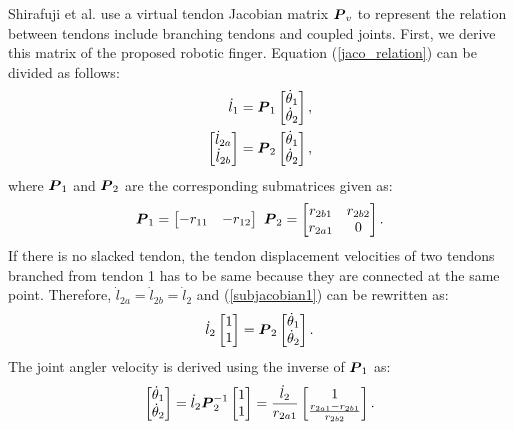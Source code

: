 \documentclass{llncs}
\def\vect#1{\mbox{\boldmath$#1$}}
\begin{document}
Shirafuji et al.\cite{shirafuji2014b} use a virtual tendon Jacobian matrix $\vect{P}_v$ to represent the relation between tendons include branching tendons and coupled joints.
First, we derive this matrix of the proposed robotic finger.
Equation (\ref{jaco_relation}) can be divided as follows:
\begin{align}
	\dot{l}_{1}&=\vect{P}_{1}
							\begin{bmatrix}
								\dot{\theta}_{1}\\
								\dot{\theta}_{2}
							\end{bmatrix},		\label{subjacobian2}\\
	\begin{bmatrix}
		\dot{l}_{2a}\\
		\dot{l}_{2b}
	\end{bmatrix}&=\vect{P}_{2}
							\begin{bmatrix}
						\dot{\theta}_{1}\\
						\dot{\theta}_{2}
							\end{bmatrix},		\label{subjacobian1}
\end{align}
where $\vect{P}_{1}$ and $\vect{P}_{2}$ are the corresponding submatrices given as:
\begin{align}
	\vect{P}_{1}=
			\begin{bmatrix}
				-r_{11}&-r_{12}
			\end{bmatrix}
				\ 
	\vect{P}_{2}=
			\begin{bmatrix}
				r_{2b1}&r_{2b2}\\
				r_{2a1}&0
			\end{bmatrix}.			\label{subjacobian_value}
\end{align}
If there is no slacked tendon, the tendon displacement velocities of two tendons branched from tendon 1 has to be same because they are connected at the same point.
Therefore, $\dot{l}_{2a}=\dot{l}_{2b}=\dot{l}_{2}$ and (\ref{subjacobian1}) can be rewritten as:
\begin{align}
	\dot{l}_{2}
	\begin{bmatrix}
		1\\
		1
	\end{bmatrix}
							=\vect{P}_{2}
							\begin{bmatrix}
						\dot{\theta}_{1}\\
						\dot{\theta}_{2}
							\end{bmatrix}.
\end{align}
The joint angler velocity is derived using the inverse of $\vect{P}_{1}$ as:
\begin{align}
		\begin{bmatrix}
	\dot{\theta}_{1}\\
	\dot{\theta}_{2}
		\end{bmatrix}
	=\dot{l}_{2}\vect{P}_{2}^{-1}
	\begin{bmatrix}
		1\\
		1
	\end{bmatrix}
									=\frac{\dot{l}_{2}}{r_{2a1}}
									\begin{bmatrix}
									1\\
									\frac{r_{2a1}-r_{2b1}}{r_{2b2}}
									\end{bmatrix}.
\label{theta}
\end{align}
\end{document}
